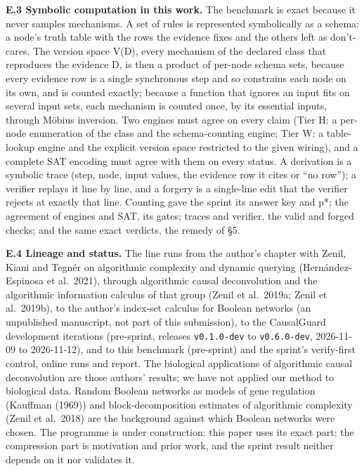 \documentclass[
  10pt,
]{article}
\begin{document}
\textbf{E.3 Symbolic computation in this work.} The benchmark is exact
because it never samples mechanisms. A set of rules is represented
symbolically as a schema: a node's truth table with the rows the
evidence fixes and the others left as don't-cares. The version space
V(D), every mechanism of the declared class that reproduces the evidence
D, is then a product of per-node schema sets, because every evidence row
is a single synchronous step and so constrains each node on its own, and
is counted exactly; because a function that ignores an input fits on
several input sets, each mechanism is counted once, by its essential
inputs, through Möbius inversion. Two engines must agree on every claim
(Tier H: a per-node enumeration of the class and the schema-counting
engine; Tier W: a table-lookup engine and the explicit version space
restricted to the given wiring), and a complete SAT encoding must agree
with them on every status. A derivation is a symbolic trace (step, node,
input values, the evidence row it cites or ``no row''); a verifier
replays it line by line, and a forgery is a single-line edit that the
verifier rejects at exactly that line. Counting gave the sprint its
answer key and p*; the agreement of engines and SAT, its gates; traces
and verifier, the valid and forged checks; and the same exact verdicts,
the remedy of §5.

\textbf{E.4 Lineage and status.} The line runs from the author's chapter
with Zenil, Kiani and Tegnér on algorithmic complexity and dynamic
querying (Hernández-Espinosa et al.~2021), through algorithmic causal
deconvolution and the algorithmic information calculus of that group
(Zenil et al.~2019a; Zenil et al.~2019b), to the author's index-set
calculus for Boolean networks (an unpublished manuscript, not part of
this submission), to the CausalGuard development iterations (pre-sprint,
releases \texttt{v0.1.0-dev} to \texttt{v0.6.0-dev}, 2026-11-09 to
2026-11-12), and to this benchmark (pre-sprint) and the sprint's
verify-first control, online runs and report. The biological
applications of algorithmic causal deconvolution are those authors'
results; we have not applied our method to biological data. Random
Boolean networks as models of gene regulation (Kauffman (1969)) and
block-decomposition estimates of algorithmic complexity (Zenil et
al.~2018) are the background against which Boolean networks were chosen.
The programme is under construction: this paper uses its exact part; the
compression part is motivation and prior work, and the sprint result
neither depends on it nor validates it.
\end{document}
